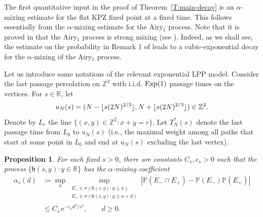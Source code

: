 \documentclass[12pt, reqno]{amsart}
\numberwithin{equation}{section}
\newtheorem{proposition}[theorem]{Proposition}
\theoremstyle{definition}
\newcommand{\R}{\mathbb{R}}
\newcommand{\h}{\mathfrak{h}}
\newcommand{\Prob}{\mathbb{P}}
\newcommand{\e}{\,\mathrm{e}}
\DeclarePairedDelimiter{\floor}{\lfloor}{\rfloor}
\begin{document}
The first quantitative input in the proof of Theorem~\ref{T:main-decay} is an
$\alpha$-mixing estimate for the flat KPZ fixed point at a fixed time. This
follows essentially from the $\alpha$-mixing estimate for the Airy$_1$ process.
Note that it is proved in \cite{basu.bhattacharjee:24:limit} that the Airy$_1$
process is strong mixing (see \cite[Remark 1]{basu.bhattacharjee:24:limit}).
Indeed, as we shall see, the estimate on the probability in Remark 1 of
\cite{basu.bhattacharjee:24:limit} leads to a cubic-exponential decay for the
$\alpha$-mixing of the Airy$_1$ process. 


Let us introduce some notations of the relevant exponential LPP model. Consider
the last passage percolation on $\mathbb{Z}^2$ with i.i.d. $\rm Exp(1)$ passage
times on the vertices.  For $s\in \R$, let 
\[
  u_N(s)= (N-\floor{s(2N)^{2/3}}, N+\floor{s(2N)^{2/3}})\in \mathbb{Z}^2.
\]
Denote by $L_r$ the line $\{(x,y) \in \mathbb{Z}^2:x+y=r\}$. Let $T_N^*(s)$
denote the last passage time from $L_0$ to $u_N(s)$ (i.e., the maximal weight
among all paths that start at some point in $L_0$ and end at $u_N(s)$ excluding the
last vertex).  


\begin{proposition}\label{P:airy1-alpha-mixing}
  For each fixed $s>0$, there are constants $C_s,c_s>0$ such that the process
  $\{\h(s,y): y\in \R\}$ has the $\alpha$-mixing coefficient
  \begin{align}
    \alpha_s(d)& \coloneqq 
    \sup_a
    \sup_{\substack{
    E_-\in\sigma(\h(s,y):y\le a)\\
    E_+\in\sigma(\h(s,y):y\ge a+d)}}
    |\Prob(E_-\cap E_+)-\Prob(E_-)\Prob(E_+)| \nonumber \\
    &
    \le
    C_s \e^{-c_s d^3/s^2},
    \qquad d\ge0.
    \label{E:airy1-alpha-mixing}
  \end{align}
\end{proposition}
\end{document}
